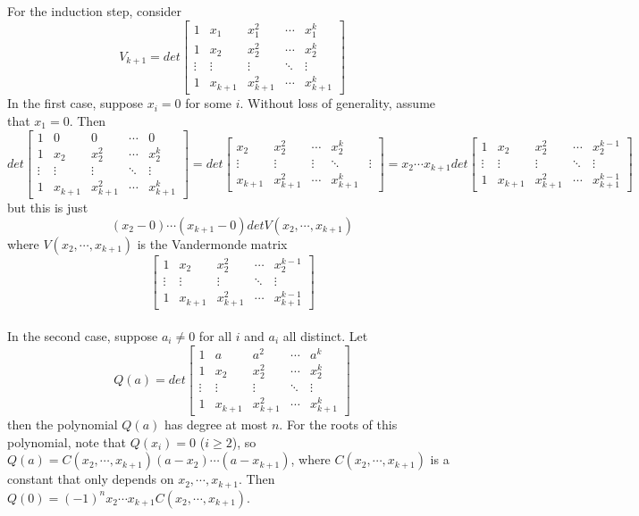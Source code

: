 \documentclass[12pt]{article}
\begin{document}
For the induction step, consider 
$$V_{k+1} = det \begin{bmatrix} 1 & x_1 & x_1^2 & \cdots & x_1^{k} \\ 1 &x_2 & x_2^2 & \cdots & x_2^{k} \\ \vdots & \vdots & \vdots & \ddots & \vdots \\ 1 &x_{k+1} & x_{k+1}^2 & \cdots & x_{k+1}^{k} \end{bmatrix}$$
In the first case, suppose $x_i = 0$ for some $i$. Without loss of generality, assume that $x_1 = 0$. Then 
$$det \begin{bmatrix} 1 & 0 & 0 & \cdots & 0 \\ 1 &x_2 & x_2^2 & \cdots & x_2^{k} \\ \vdots & \vdots & \vdots & \ddots & \vdots \\ 1 &x_{k+1} & x_{k+1}^2 & \cdots & x_{k+1}^{k} \end{bmatrix} = det \begin{bmatrix} x_2 & x_2^2 & \cdots & x_2^{k} \\ \vdots & \vdots & \vdots & \ddots & \vdots \\ x_{k+1} & x_{k+1}^2 & \cdots & x_{k+1}^{k} \end{bmatrix} = x_2 \cdots x_{k+1} det \begin{bmatrix} 1 &x_2 & x_2^2 & \cdots & x_2^{k-1} \\ \vdots & \vdots & \vdots & \ddots & \vdots \\ 1 & x_{k+1} & x_{k+1}^2 & \cdots & x_{k+1}^{k-1} \end{bmatrix}$$
but this is just
$$(x_2 - 0) \cdots (x_{k+1} - 0) det V(x_2, \cdots, x_{k+1}) $$
where $V(x_2, \cdots, x_{k+1})$ is the Vandermonde matrix 
$$\begin{bmatrix} 1 &x_2 & x_2^2 & \cdots & x_2^{k-1} \\ \vdots & \vdots & \vdots & \ddots & \vdots \\ 1 & x_{k+1} & x_{k+1}^2 & \cdots & x_{k+1}^{k-1} \end{bmatrix}$$\\

In the second case, suppose $a_i \neq 0$ for all $i$ and $a_i$ all distinct. Let
$$Q(a) = det \begin{bmatrix} 1 & a & a^2 & \cdots & a^{k} \\ 1 &x_2 & x_2^2 & \cdots & x_2^{k} \\ \vdots & \vdots & \vdots & \ddots & \vdots \\ 1 &x_{k+1} & x_{k+1}^2 & \cdots & x_{k+1}^{k} \end{bmatrix}$$
then the polynomial $Q(a)$ has degree at most $n$. For the roots of this polynomial, note that $Q(x_i) = 0$ ($i \geq 2$), so $Q(a) = C(x_2, \cdots, x_{k+1}) (a - x_2) \cdots (a - x_{k+1})$, where $C(x_2, \cdots, x_{k+1})$ is a constant that only depends on $x_2, \cdots, x_{k+1}$. Then $Q(0) = (-1)^n x_2 \cdots x_{k+1} C(x_2, \cdots, x_{k+1})$.\\
\end{document}
